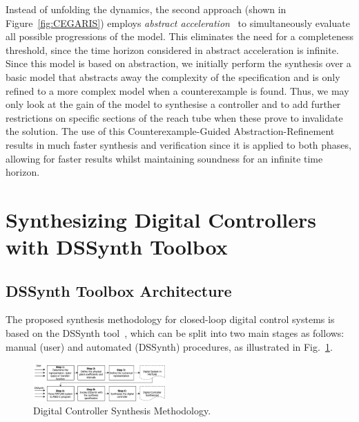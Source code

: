 \documentclass[10pt,conference]{IEEEtran}
\newcommand\tool{{DSSynth Toolbox}\xspace}
\begin{document}
Instead of unfolding the dynamics, the second approach (shown in Figure~\ref{fig:CEGARIS}) 
employs {\em abstract acceleration}~\cite{cattaruzza2015unbounded} to 
simultaneously evaluate all possible progressions of the model. This eliminates the need for
a completeness threshold, since the time horizon considered in abstract acceleration is infinite.
Since this model is based on abstraction, we initially perform the synthesis over a basic
model that abstracts away the complexity of the specification and is only refined to a more
complex model when a counterexample is found. Thus, we may only look at the gain of the
model to synthesise a controller and to add further restrictions on specific sections of the reach
tube when these prove to invalidate the solution. The use of this Counterexample-Guided 
Abstraction-Refinement results in much faster synthesis and verification since it is applied to
both phases, allowing for faster results whilst maintaining soundness for an infinite time horizon.
 

\section{Synthesizing Digital Controllers with \tool}

\subsection{\tool Architecture}

The proposed synthesis methodology for closed-loop digital control
systems is based on the DSSynth tool~\cite{abate2017, abatecav2017}, 
which can be split into two main stages as follows: manual (user) and 
automated (DSSynth) procedures, as illustrated in Fig.~\ref{fig:synthesis-flow}. 
%
\begin{figure}[ht!]
\centering
\includegraphics[width=0.45\textwidth]{synthesis-flow.pdf}
\caption{Digital Controller Synthesis Methodology.}
\label{fig:synthesis-flow}
\end{figure}
\end{document}
